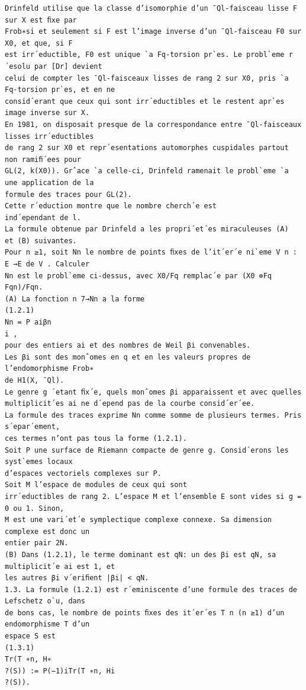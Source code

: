 \documentclass[11pt]{article}
\begin{document}
\begin{Verbatim}[breaklines=true,fontsize=\small]
Drinfeld utilise que la classe d’isomorphie d’un ¯Ql-faisceau lisse F sur X est ﬁxe par
Frob∗si et seulement si F est l’image inverse d’un ¯Ql-faisceau F0 sur X0, et que, si F
est irr´eductible, F0 est unique `a Fq-torsion pr`es. Le probl`eme r´esolu par [Dr] devient
celui de compter les ¯Ql-faisceaux lisses de rang 2 sur X0, pris `a Fq-torsion pr`es, et en ne
consid´erant que ceux qui sont irr´eductibles et le restent apr`es image inverse sur X.
En 1981, on disposait presque de la correspondance entre ¯Ql-faisceaux lisses irr´eductibles
de rang 2 sur X0 et repr´esentations automorphes cuspidales partout non ramiﬁ´ees pour
GL(2, k(X0)). Grˆace `a celle-ci, Drinfeld ramenait le probl`eme `a une application de la
formule des traces pour GL(2).
Cette r´eduction montre que le nombre cherch´e est
ind´ependant de l.
La formule obtenue par Drinfeld a les propri´et´es miraculeuses (A)
et (B) suivantes.
Pour n ≥1, soit Nn le nombre de points ﬁxes de l’it´er´e ni`eme V n : E →E de V . Calculer
Nn est le probl`eme ci-dessus, avec X0/Fq remplac´e par (X0 ⊗Fq Fqn)/Fqn.
(A) La fonction n 7→Nn a la forme
(1.2.1)
Nn = P aiβn
i ,
pour des entiers ai et des nombres de Weil βi convenables.
Les βi sont des monˆomes en q et en les valeurs propres de l’endomorphisme Frob∗
de H1(X, ¯Ql).
Le genre g ´etant ﬁx´e, quels monˆomes βi apparaissent et avec quelles
multiplicit´es ai ne d´epend pas de la courbe consid´er´ee.
La formule des traces exprime Nn comme somme de plusieurs termes. Pris s´epar´ement,
ces termes n’ont pas tous la forme (1.2.1).
Soit P une surface de Riemann compacte de genre g. Consid´erons les syst`emes locaux
d’espaces vectoriels complexes sur P.
Soit M l’espace de modules de ceux qui sont
irr´eductibles de rang 2. L’espace M et l’ensemble E sont vides si g = 0 ou 1. Sinon,
M est une vari´et´e symplectique complexe connexe. Sa dimension complexe est donc un
entier pair 2N.
(B) Dans (1.2.1), le terme dominant est qN: un des βi est qN, sa multiplicit´e ai est 1, et
les autres βi v´eriﬁent |βi| < qN.
1.3. La formule (1.2.1) est r´eminiscente d’une formule des traces de Lefschetz o`u, dans
de bons cas, le nombre de points ﬁxes des it´er´es T n (n ≥1) d’un endomorphisme T d’un
espace S est
(1.3.1)
Tr(T ∗n, H∗
?(S)) := P(−1)iTr(T ∗n, Hi
?(S)).


\end{Verbatim}
\end{document}
